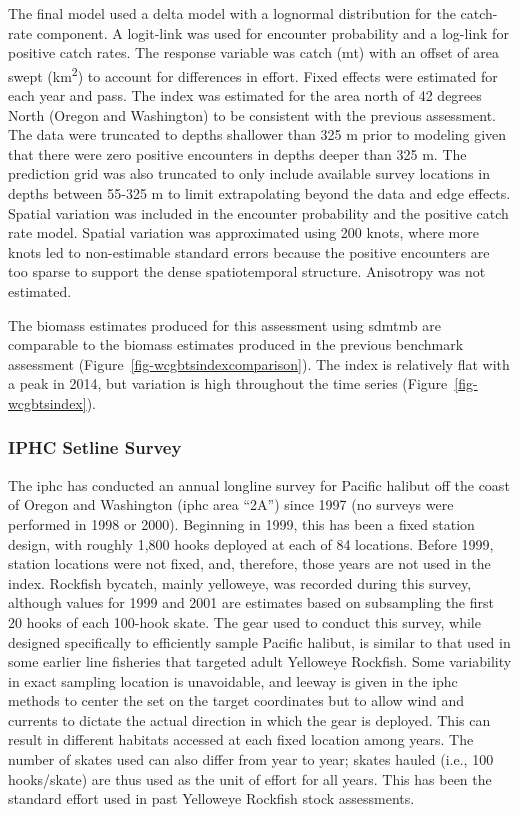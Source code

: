 \documentclass[
]{scrartcl}
\begin{document}
The final model used a delta model with a lognormal distribution for the
catch-rate component. A logit-link was used for encounter probability
and a log-link for positive catch rates. The response variable was catch
(mt) with an offset of area swept (km\textsuperscript{2}) to account for
differences in effort. Fixed effects were estimated for each year and
pass. The index was estimated for the area north of 42 degrees North
(Oregon and Washington) to be consistent with the previous assessment.
The data were truncated to depths shallower than 325 m prior to modeling
given that there were zero positive encounters in depths deeper than 325
m. The prediction grid was also truncated to only include available
survey locations in depths between 55-325 m to limit extrapolating
beyond the data and edge effects. Spatial variation was included in the
encounter probability and the positive catch rate model. Spatial
variation was approximated using 200 knots, where more knots led to
non-estimable standard errors because the positive encounters are too
sparse to support the dense spatiotemporal structure. Anisotropy was not
estimated.

The biomass estimates produced for this assessment using \gls{sdmtmb}
are comparable to the biomass estimates produced in the previous
benchmark assessment (Figure~\ref{fig-wcgbtsindexcomparison}). The index
is relatively flat with a peak in 2014, but variation is high throughout
the time series (Figure~\ref{fig-wcgbtsindex}).

\subsubsection{IPHC Setline Survey}\label{iphc-setline-survey}

The \gls{iphc} has conducted an annual longline survey for Pacific
halibut off the coast of Oregon and Washington (\gls{iphc} area ``2A'')
since 1997 (no surveys were performed in 1998 or 2000). Beginning in
1999, this has been a fixed station design, with roughly 1,800 hooks
deployed at each of 84 locations. Before 1999, station locations were
not fixed, and, therefore, those years are not used in the index.
Rockfish bycatch, mainly yelloweye, was recorded during this survey,
although values for 1999 and 2001 are estimates based on subsampling the
first 20 hooks of each 100-hook skate. The gear used to conduct this
survey, while designed specifically to efficiently sample Pacific
halibut, is similar to that used in some earlier line fisheries that
targeted adult Yelloweye Rockfish. Some variability in exact sampling
location is unavoidable, and leeway is given in the \gls{iphc} methods
to center the set on the target coordinates but to allow wind and
currents to dictate the actual direction in which the gear is deployed.
This can result in different habitats accessed at each fixed location
among years. The number of skates used can also differ from year to
year; skates hauled (i.e., 100 hooks/skate) are thus used as the unit of
effort for all years. This has been the standard effort used in past
Yelloweye Rockfish stock assessments.
\end{document}
